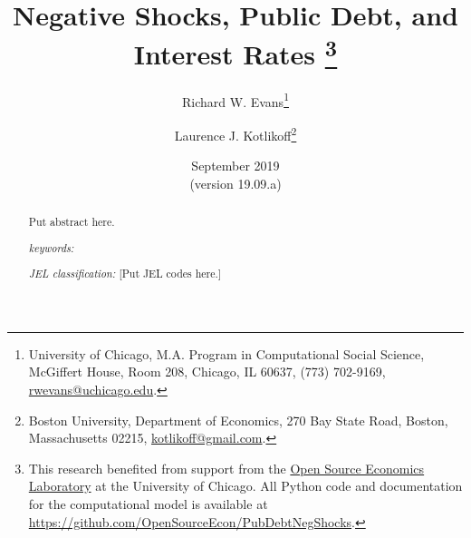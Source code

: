 \documentclass[letterpaper,12pt]{article}
\theoremstyle{definition}
\begin{document}
\begin{titlepage}
\title{Negative Shocks, Public Debt, and Interest Rates \thanks{This research benefited from support from the \href{https://www.oselab.org/}{Open Source Economics Laboratory} at the University of Chicago. All Python code and documentation for the computational model is available at \href{https://github.com/OpenSourceEcon/PubDebtNegShocks}{https://github.com/OpenSourceEcon/PubDebtNegShocks}.}
}
\author{
  Richard W. Evans\footnote{University of Chicago, M.A. Program in Computational Social Science, McGiffert House, Room 208, Chicago, IL 60637, (773) 702-9169, \href{mailto:rwevans@uchicago.edu}{rwevans@uchicago.edu}.}
  \and
  Laurence J. Kotlikoff\footnote{Boston University, Department of Economics, 270 Bay State Road, Boston, Massachusetts 02215, \href{mailto:kotlikoff@gmail.com}{kotlikoff@gmail.com}.}
  }
\date{September 2019 \\
  \scriptsize{(version 19.09.a)}}
\maketitle
\vspace{-9mm}
\begin{abstract}
  Put abstract here.
  \vspace{3mm}

  \noindent\textit{keywords:}

  \vspace{3mm}

  \noindent\textit{JEL classification:} [Put JEL codes here.]

\end{abstract}
\thispagestyle{empty}
\end{titlepage}
\end{document}
